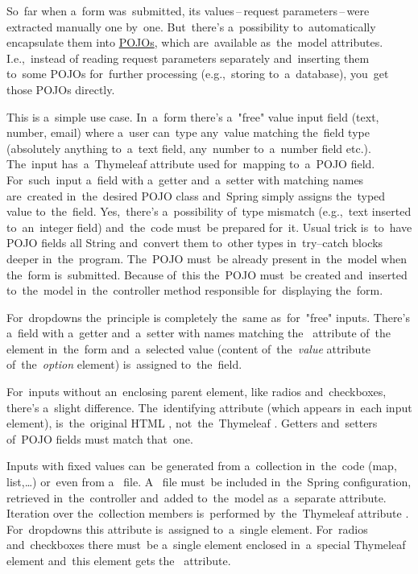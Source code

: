 So~far when a~form was~submitted, its values\,--\,request parameters\,--\,were extracted manually one by~one.
But~there's a~possibility to~automatically encapsulate them into \hyperref[pojo]{POJOs}, which are~available as~the~model attributes.
I.e.,~instead of reading request parameters separately and~inserting them to~some POJOs for~further processing (e.g.,~storing to~a~database), you~get those POJOs directly.

This is a~simple use case.
In~a~form there's a~"free" value input field (text, number, email) where a~user can~type any~value matching the~field type (absolutely anything to~a~text field, any~number to~a~number field etc.).
The~input has~a~Thymeleaf attribute  used for~mapping to~a~POJO field.
For~such~input a~field with a~getter and~a~setter with matching names are~created in~the~desired POJO class and~Spring simply assigns the~typed value to~the~field.
Yes,~there's a~possibility of~type mismatch (e.g.,~text inserted to~an~integer field) and~the~code must~be prepared for~it.
Usual trick is~to~have POJO fields all String and~convert them to~other types in~try--catch blocks deeper in~the~program.
The~POJO must~be already present in~the~model when the~form is~submitted.
Because of~this the~POJO must~be created and~inserted to~the~model in~the~controller method responsible for~displaying the~form.

For~dropdowns the~principle is completely the~same as~for~"free" inputs.
There's a~field with a~getter and~a~setter with names matching the~ attribute of~the~ element in~the~form and~a~selected value (content of~the~\textit{value} attribute of~the~\textit{option} element) is~assigned to~the~field.

For~inputs without an~enclosing parent element, like radios and~checkboxes, there's a~slight difference.
The~identifying attribute (which appears in~each input element), is~the~original HTML , not~the~Thymeleaf .
Getters and~setters of~POJO fields must match that~one.

Inputs with fixed values can~be generated from a~collection in~the~code (map, list,\dots) or~even from a~\hyperref[properties]{} file.
A~ file must~be included in~the~Spring configuration, retrieved in~the~controller and~added to~the~model as~a~separate attribute.
Iteration over the~collection members is~performed by~the~Thymeleaf attribute .
For~dropdowns this attribute is~assigned to~a~single  element.
For~radios and~checkboxes there must~be a~single  element enclosed in~a~special Thymeleaf element  and~this element gets the~ attribute.

